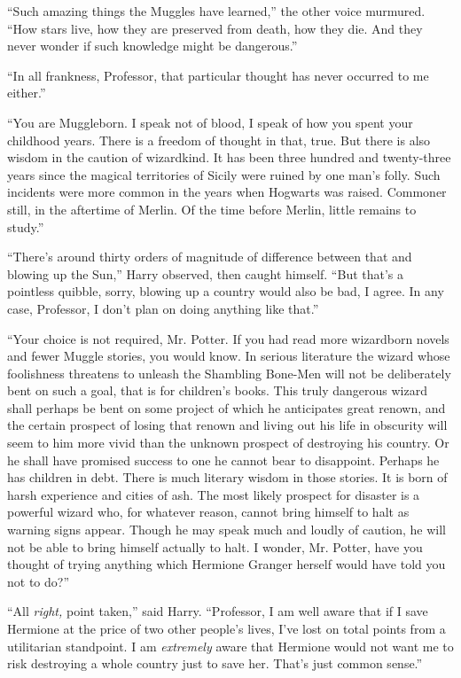 ``Such amazing things the Muggles have learned,'' the other voice murmured. ``How stars live, how they are preserved from death, how they die. And they never wonder if such knowledge might be dangerous.''

``In all frankness, Professor, that particular thought has never occurred to me either.''

``You are Muggleborn. I speak not of blood, I speak of how you spent your childhood years. There is a freedom of thought in that, true. But there is also wisdom in the caution of wizardkind. It has been three hundred and twenty-three years since the magical territories of Sicily were ruined by one man's folly. Such incidents were more common in the years when Hogwarts was raised. Commoner still, in the aftertime of Merlin. Of the time before Merlin, little remains to study.''

``There's around thirty orders of magnitude of difference between that and blowing up the Sun,'' Harry observed, then caught himself. ``But that's a pointless quibble, sorry, blowing up a country would also be bad, I agree. In any case, Professor, I don't plan on doing anything like that.''

``Your choice is not required, Mr. Potter. If you had read more wizardborn novels and fewer Muggle stories, you would know. In serious literature the wizard whose foolishness threatens to unleash the Shambling Bone-Men will not be deliberately bent on such a goal, that is for children's books. This truly dangerous wizard shall perhaps be bent on some project of which he anticipates great renown, and the certain prospect of losing that renown and living out his life in obscurity will seem to him more vivid than the unknown prospect of destroying his country. Or he shall have promised success to one he cannot bear to disappoint. Perhaps he has children in debt. There is much literary wisdom in those stories. It is born of harsh experience and cities of ash. The most likely prospect for disaster is a powerful wizard who, for whatever reason, cannot bring himself to halt as warning signs appear. Though he may speak much and loudly of caution, he will not be able to bring himself actually to halt. I wonder, Mr. Potter, have you thought of trying anything which Hermione Granger herself would have told you not to do?''

``All \emph{right,} point taken,'' said Harry. ``Professor, I am well aware that if I save Hermione at the price of two other people's lives, I've lost on total points from a utilitarian standpoint. I am \emph{extremely} aware that Hermione would not want me to risk destroying a whole country just to save her. That's just common sense.''

